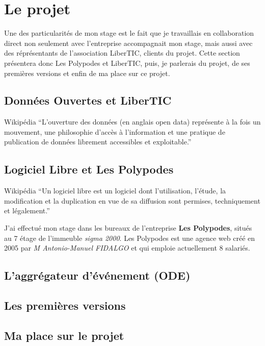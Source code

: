 \section{Le projet}

Une des particularités de mon stage est le fait que je travaillais en collaboration direct non seulement avec l'entreprise accompagnait mon stage, mais aussi avec des réprésentants de l'association LiberTIC, clients du projet. Cette section présentera donc Les Polypodes et LiberTIC, puis, je parlerais du projet, de ses premières versions et enfin de ma place sur ce projet.

\subsection{Données Ouvertes et LiberTIC}

\begin{aquote}{Wikipédia}
``L'ouverture des données (en anglais open data) représente à la fois un mouvement, une philosophie d'accès à l'information et une pratique de publication de données librement accessibles et exploitable.''
\end{aquote}


\subsection{Logiciel Libre et Les Polypodes}

\begin{aquote}{Wikipédia}
``Un logiciel libre est un logiciel dont l'utilisation, l'étude, la modification et la duplication en vue de sa diffusion sont permises, techniquement et légalement.''
\end{aquote}


J'ai effectué mon stage dans les bureaux de l'entreprise \textbf{Les Polypodes}, situés au 7 étage de l'immeuble \textit{sigma 2000}.
Les Polypodes est une agence web créé en 2005 par \textit{M Antonio-Manuel FIDALGO} et qui emploie actuellement 8 salariés.


\subsection{L'aggrégateur d'événement (ODE)}

\subsection{Les premières versions}

\subsection{Ma place sur le projet}